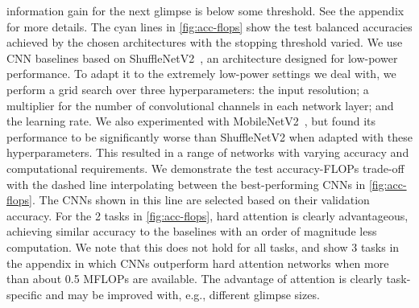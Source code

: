 information gain for the next glimpse is below some threshold. See the appendix
for more details. The cyan lines in \cref{fig:acc-flops} show the test balanced
accuracies achieved by the chosen architectures with the stopping threshold
varied.
%
%
We use CNN baselines based on ShuffleNetV2~\cite{ma2018shufflenet}, an
architecture designed for low-power performance. To adapt it to the extremely
low-power settings we deal with, we perform a grid search over three
hyperparameters: the input resolution; a multiplier for the number of
convolutional channels in each network layer; and the learning rate. We also
experimented with MobileNetV2~\cite{sandler2018mobilenetv2}, but found its
performance to be significantly worse than ShuffleNetV2 when adapted with these
hyperparameters. This resulted in a range of networks with varying accuracy and
computational requirements. We demonstrate the test accuracy-FLOPs trade-off
with the dashed line interpolating between the best-performing CNNs in
\cref{fig:acc-flops}. The CNNs shown in this line are selected based on their
validation accuracy. For the 2 tasks in \cref{fig:acc-flops}, hard attention is
clearly advantageous, achieving similar accuracy to the baselines with an order
of magnitude less computation. We note that this does not hold for all tasks,
and show 3 tasks in the appendix in which CNNs outperform hard attention
networks when more than about 0.5 MFLOPs are available. The advantage of
attention is clearly task-specific and may be improved with, e.g., different
glimpse sizes.


